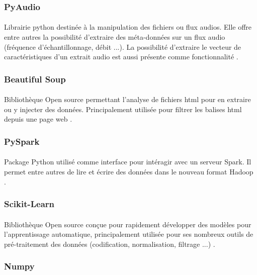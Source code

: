 		\subsubsection*{PyAudio}
		\paragraph{}
		Librairie python destinée à la manipulation des fichiers ou flux audios. Elle offre entre autres la possibilité d'extraire des méta-données sur un flux audio (fréquence d'échantillonnage, débit ...). La possibilité d'extraire le vecteur de caractéristiques d'un extrait audio est aussi présente comme fonctionnalité \cite{pyaudio}.
		
		\subsubsection*{Beautiful Soup}
		\paragraph{}
		Bibliothèque Open source permettant l'analyse de fichiers html pour en extraire ou y injecter des données. Principalement utilisée pour filtrer les balises html depuis une page web \cite{bs4}.
		
		\subsubsection*{PySpark}
		\paragraph{}
		Package Python utilisé comme interface pour intéragir avec un serveur Spark. Il permet entre autres de lire et écrire des données dans le nouveau format Hadoop \cite{pyspark}.
		
		\subsubsection*{Scikit-Learn}
		\paragraph{}
		Bibliothèque Open source conçue pour rapidement développer des modèles pour l'apprentissage automatique, principalement utilisée pour ses nombreux outils de pré-traitement des données (codification, normalisation, filtrage ...) \cite{sklearn}.
		
		\subsubsection*{Numpy}
